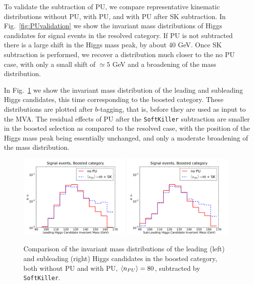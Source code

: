 To validate the subtraction of PU,
we compare representative kinematic distributions
without PU, with PU, and with PU after SK subtraction.
%
In Fig.~\ref{fig:PUvalidation} we show the
invariant mass distributions of Higgs candidates for signal
events in the resolved category.
%
If PU is not subtracted there is a large shift in the Higgs mass
peak, by about 40 GeV.
%
Once SK subtraction is performed, we recover a distribution much closer
to the no PU case, with only a small shift of $\simeq 5$ GeV
and a broadening of the mass
distribution.
%

In Fig.~\ref{fig:m_H_PU} we show the invariant mass distribution
of the leading and subleading Higgs candidates,
this time corresponding
to the boosted category.
%
These distributions are plotted
after
$b$-tagging, that is,
before they are used as input to the MVA.
%
The residual effects of PU
after the {\tt SoftKiller} subtraction are smaller
in the boosted selection as compared to the resolved case,
with the position of the Higgs mass peak being essentially
unchanged, and only a moderate broadening of the
mass distribution.
%

\begin{figure}[t]
  \begin{center}
      \includegraphics[width=0.49\textwidth]{plots/m_H0_bst_comp.pdf}
      \includegraphics[width=0.49\textwidth]{plots/m_H1_bst_comp.pdf}
  \caption{\small
    Comparison of the invariant mass distributions of the leading (left)
    and subleading (right) Higgs candidates
    in the boosted category,
    both without PU and with
    PU, $\left\langle n_{PU}\right\rangle=80$, subtracted by {\tt SoftKiller}.
}
\label{fig:m_H_PU}
\end{center}
\end{figure}

